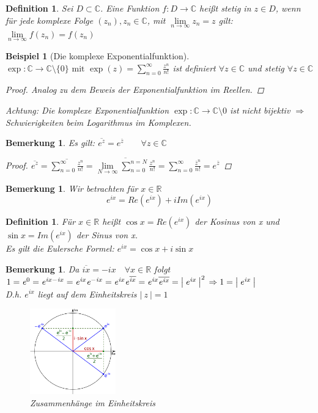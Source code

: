 \documentclass[a4paper,titlepage,oneside]{article}
\def\C{\ensuremath{\mathbb{C}} }
\def\R{\ensuremath{\mathbb{R}} }
\def\im{\ensuremath{\mathit{i}} }
\def\e{\ensuremath{\mathit{e}} }
\newcommand{\suminf}[2][n]{\ensuremath{\sum_{#1= 0}^{\infty}{#2}}}
\renewcommand{\liminf}[2][n]{\ensuremath{\lim\limits_{#1 \rightarrow \infty}{#2}}}
\newcommand{\abs}[1]{\ensuremath{\left|\:#1\:\right|}}
\theoremstyle{thmstyle}
\newtheorem{defi}[satz]{Definition}
\newtheorem{bsp}[satz]{Beispiel}
\newtheorem{bem}[satz]{Bemerkung}
\theoremstyle{subthmstyle}
\begin{document}
\begin{defi}
Sei $ D \subset \C$. Eine Funktion $f: D \to \C $ heißt stetig in $z \in D$, wenn für jede komplexe Folge $(z_n), z_n \in \C$, mit $\liminf{z_n} = z$ gilt:
$\liminf{f(z_n)} = f(z_n)$
\end{defi}


\begin{bsp}[Die komplexe Exponentialfunktion]
$ \displaystyle \exp: \C \to \C\setminus\{0\} \text{ mit } \exp(z) = \suminf{\frac{z^n}{n!}}$ ist definiert $\forall z\in \C$ und stetig $\forall z\in \C$
\begin{proof} Analog zu dem Beweis der Exponentialfunktion im Reellen.
\end{proof}
Achtung: Die komplexe Exponentialfunktion $\exp: \C \to \C\setminus{0}$ ist nicht bijektiv $\Rightarrow$ Schwierigkeiten beim Logarithmus im Komplexen.
\end{bsp}

\begin{bem}
Es gilt: $ \overline{\e^z} = \e^{\overline{z}} \qquad \forall z\in \C$
\begin{proof}
$ \displaystyle \overline{\e^z} = \overline{\suminf{\frac{z^n}{n!}}} = \overline{\liminf[N]{\sum_{n=0}^{n=N}{\frac{z^n}{n!}}}} =  \suminf{\frac{\overline{z}^n}{n!}} = \e^{\overline{z}}$
\end{proof}
\end{bem}

\begin{bem}
Wir betrachten für $x \in \R$ \[\e^{\im x} = Re(\e^{\im x}) + \im Im(\e^{\im x}) \]
\end{bem}

\begin{defi}
Für $ x\in \R$ heißt $\cos x = Re(\e^{\im x})$ der Kosinus von x und $\sin x = Im(\e^{\im x})$ der Sinus von x.\\
Es gilt die Eulersche Formel: $\e^{\im x} = \cos x + \im \sin x$
\end{defi}

\begin{bem}
Da $\overline{\im x} = - \im x \quad \forall x \in \R$
folgt $1 = \e^0 = \e^{\im x - \im x}= \e^{\im x}\e^{-\im x} = \e^{\im x} \e^{\overline{\im x}} = \e^{\im x} \overline{\e^{\im x}} = \abs{\e^{\im x}}^2\\
\Rightarrow 1 = \abs{\e^{\im x}}$ \\
D.h. $ \e^{\im x}$ liegt auf dem Einheitskreis $ \abs{z} = 1$\\
\begin{figure}[ht]\centering
 \includegraphics[width=0.33\textwidth]{images/einheitskreis_sincosexp.png}
\caption{Zusammenhänge im Einheitskreis}
\end{figure}
\end{bem}
\end{document}
